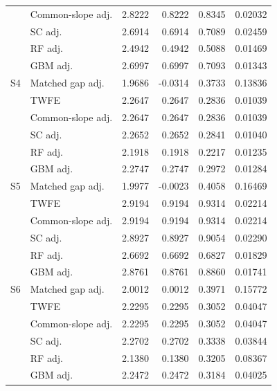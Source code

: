 \begin{longtable}{llrrrr}
 & Common-slope adj. & 2.8222 & 0.8222 & 0.8345 & 0.02032 \\
 & SC adj. & 2.6914 & 0.6914 & 0.7089 & 0.02459 \\
 & RF adj. & 2.4942 & 0.4942 & 0.5088 & 0.01469 \\
 & GBM adj. & 2.6997 & 0.6997 & 0.7093 & 0.01343 \\
\midrule
S4 & Matched gap adj. & 1.9686 & -0.0314 & 0.3733 & 0.13836 \\
 & TWFE & 2.2647 & 0.2647 & 0.2836 & 0.01039 \\
 & Common-slope adj. & 2.2647 & 0.2647 & 0.2836 & 0.01039 \\
 & SC adj. & 2.2652 & 0.2652 & 0.2841 & 0.01040 \\
 & RF adj. & 2.1918 & 0.1918 & 0.2217 & 0.01235 \\
 & GBM adj. & 2.2747 & 0.2747 & 0.2972 & 0.01284 \\
\midrule
S5 & Matched gap adj. & 1.9977 & -0.0023 & 0.4058 & 0.16469 \\
 & TWFE & 2.9194 & 0.9194 & 0.9314 & 0.02214 \\
 & Common-slope adj. & 2.9194 & 0.9194 & 0.9314 & 0.02214 \\
 & SC adj. & 2.8927 & 0.8927 & 0.9054 & 0.02290 \\
 & RF adj. & 2.6692 & 0.6692 & 0.6827 & 0.01829 \\
 & GBM adj. & 2.8761 & 0.8761 & 0.8860 & 0.01741 \\
\midrule
S6 & Matched gap adj. & 2.0012 & 0.0012 & 0.3971 & 0.15772 \\
 & TWFE & 2.2295 & 0.2295 & 0.3052 & 0.04047 \\
 & Common-slope adj. & 2.2295 & 0.2295 & 0.3052 & 0.04047 \\
 & SC adj. & 2.2702 & 0.2702 & 0.3338 & 0.03844 \\
 & RF adj. & 2.1380 & 0.1380 & 0.3205 & 0.08367 \\
 & GBM adj. & 2.2472 & 0.2472 & 0.3184 & 0.04025 \\
\end{longtable}